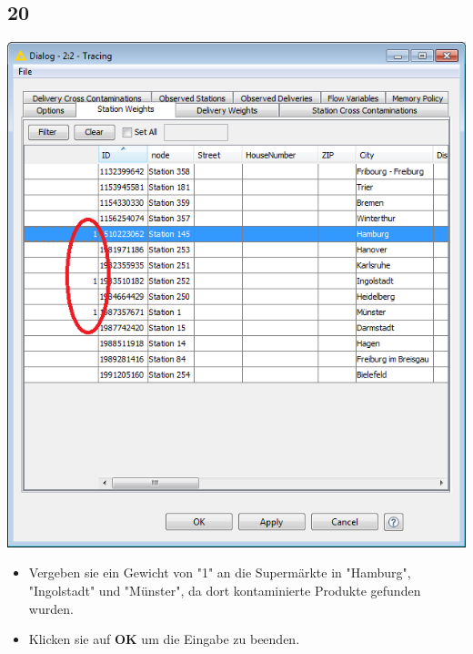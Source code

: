 \documentclass{beamer}
\begin{document}
\subsection{20}
\begin{frame}
	\begin{center}
  		\includegraphics[height=0.6\textheight]{20.png}
	\end{center}
	\begin{itemize}
		\item Vergeben sie ein Gewicht von "1" an die Supermärkte in "Hamburg", "Ingolstadt" und "Münster", da dort kontaminierte Produkte gefunden wurden.
		\item Klicken sie auf \textbf{OK} um die Eingabe zu beenden.
	\end{itemize}
\end{frame}
\end{document}
